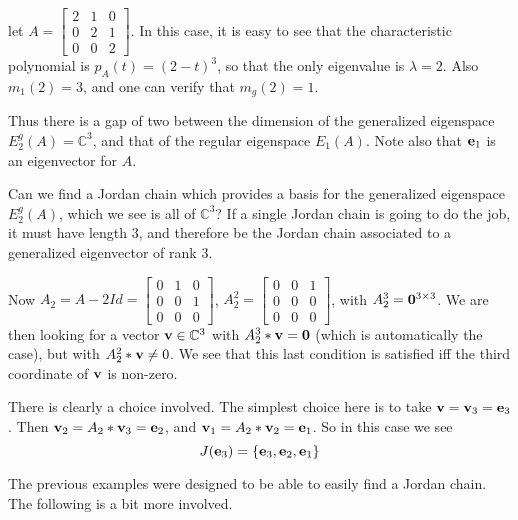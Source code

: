 \documentclass{ximera}
\begin{document}
\begin{example} let $A = \begin{bmatrix} 2 & 1 & 0\\0 & 2 & 1\\0 & 0 & 2\end{bmatrix}$. In this case, it is easy to see that the characteristic polynomial is $p_A(t) = (2-t)^3$, so that the only eigenvalue is $\lambda = 2$. Also $m_1(2) = 3$, and one can verify that $m_g(2) = 1$. 

Thus there is a gap of two between the dimension of the generalized eigenspace $E^g_2(A) = \mathbb C^3$, and that of the regular eigenspace $E_1(A)$. Note also that ${\bf e}_1$ is an eigenvector for $A$.

Can we find a Jordan chain which provides a basis for the generalized eigenspace $E^g_2(A)$, which we see is all of $\mathbb C^3$? If a single Jordan chain is going to do the job, it must have length $3$, and therefore be the Jordan chain associated to a generalized eigenvector of rank $3$.

Now $A_2 = A - 2Id = \begin{bmatrix} 0 & 1 & 0\\  0 & 0 & 1\\ 0 & 0 & 0\end{bmatrix}$, $A_2^2 = \begin{bmatrix} 0 & 0 & 1\\ 0 & 0 & 0 \\ 0 & 0 & 0\end{bmatrix}$, with $A_2^3 = {\bf 0}^{3\times 3}$. We are then looking for a vector ${\bf v}\in\mathbb C^3$ with $A_2^3*{\bf v} = \bf 0$ (which is automatically the case), but with $A_2^2*{\bf v}\ne 0$. We see that this last condition is satisfied iff the third coordinate of ${\bf v}$ is non-zero.

There is clearly a choice involved. The simplest choice here is to take ${\bf v} = {\bf v}_3 = {\bf e}_3$.  Then ${\bf v}_2 = A_2*{\bf v}_3 = {\bf e}_2$, and ${\bf v}_1 = A_2*{\bf v}_2 = {\bf e}_1$. So in this case we see
\[
J({\bf e}_3) = \{{\bf e}_3, {\bf e}_2, {\bf e}_1\}
\]
\end{example}

The previous examples were designed to be able to easily find a Jordan chain. The following is a bit more involved.
\end{document}
